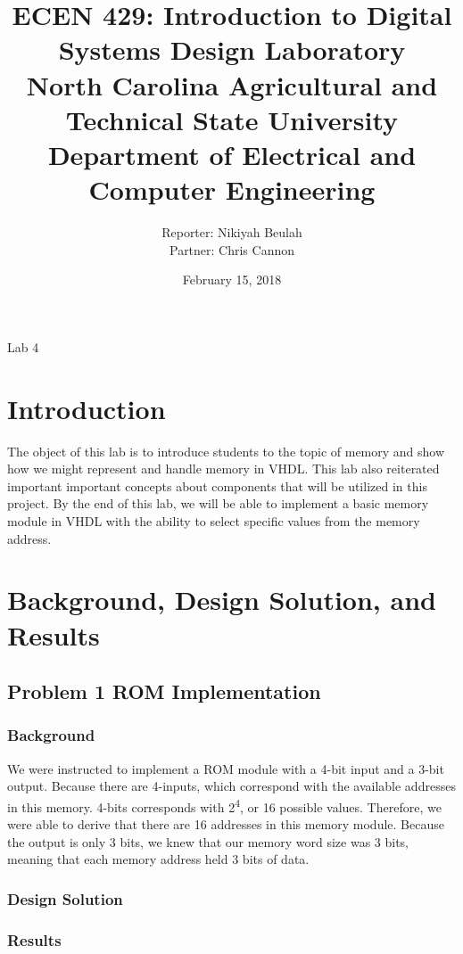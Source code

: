 \documentclass[11pt]{article}
\title {{\titleFont ECEN 429: Introduction to Digital Systems Design Laboratory \\ North Carolina Agricultural and Technical State University \\ Department of Electrical and Computer Engineering}} %
\author{\titleFont Reporter: Nikiyah Beulah \\ \titleFont Partner: Chris Cannon} %
\date{\titleFont February 15, 2018}
\begin{document}
\begin{titlingpage}
\maketitle
\begin{center}
	Lab 4
\end{center}
\end{titlingpage}

\section{Introduction}
The object of this lab is to introduce students to the topic of memory and show how we might represent and handle memory in VHDL. This lab also reiterated important important concepts about components that will be utilized in this project. By the end of this lab, we will be able to implement a basic memory module in VHDL with the ability to select specific values from the memory address.

\section{Background, Design Solution, and Results}

\subsection{Problem 1 ROM Implementation}

\subsubsection{Background}
We were instructed to implement a ROM module with a 4-bit input and a 3-bit output. Because there are 4-inputs, which correspond with the available addresses in this memory. 4-bits corresponds with 2\textsuperscript{4}, or 16 possible values. Therefore, we were able to derive that there are 16 addresses in this memory module. Because the output is only 3 bits, we knew that our memory word size was 3 bits, meaning that each memory address held 3 bits of data.

\subsubsection{Design Solution}

\subsubsection{Results}
\end{document}
